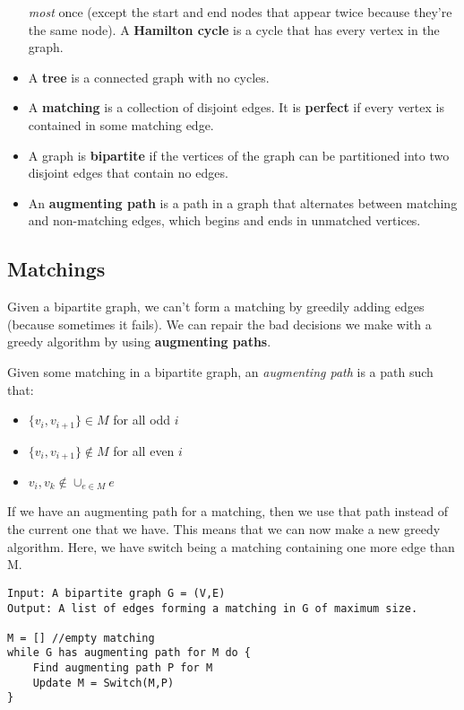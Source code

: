 \documentclass[11pt,fleqn,a4paper,titlepage,dvipsnames,cmyk]{scrartcl}
\begin{document}
\begin{itemize}
        \textit{most} once (except the start and end nodes that appear
        twice because they're the same node). A \textbf{Hamilton cycle} is
        a cycle that has every vertex in the graph.
    \item A \textbf{tree} is a connected graph with no cycles.
    \item A \textbf{matching} is a collection of disjoint edges. It is
        \textbf{perfect} if every vertex is contained in some matching
        edge.
    \item A graph is \textbf{bipartite} if the vertices of the graph can
        be partitioned into two disjoint edges that contain no edges.
    \item An \textbf{augmenting path} is a path in a graph that alternates
        between matching and non-matching edges, which begins and ends in
        unmatched vertices.
\end{itemize}

\subsection{Matchings}%
\label{sub:Matchings}
Given a bipartite graph, we can't form a matching by greedily adding edges
(because sometimes it fails). We can repair the bad decisions we make with
a greedy algorithm by using \textbf{augmenting paths}.

Given some matching in a bipartite graph, an \textit{augmenting path} is a
path such that:
\begin{itemize}
    \item $\{v_i, v_{i+1}\} \in M$ for all odd $i$
    \item $\{v_i, v_{i+1}\} \not \in M$ for all even $i$
    \item $v_i, v_k \not \in \cup_{e \in M}e$
\end{itemize}

If we have an augmenting path for a matching, then we use that path
instead of the current one that we have. This means that we can now make a
new greedy algorithm. Here, we have switch being a matching containing one
more edge than M.

\begin{lstlisting}
Input: A bipartite graph G = (V,E)
Output: A list of edges forming a matching in G of maximum size.

M = [] //empty matching
while G has augmenting path for M do {
    Find augmenting path P for M
    Update M = Switch(M,P)
}
\end{lstlisting}
\end{document}
